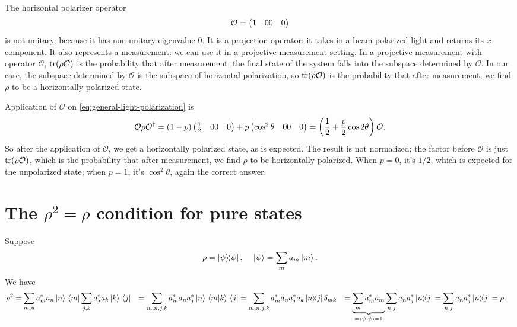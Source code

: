 \documentclass[hyperref, a4paper]{article}
\def\\{}%
\begin{document}
The horizontal polarizer operator 
\begin{equation}
    \mathcal{O} = \pmqty{
        1 & 0 \\ 0 & 0
    }
\end{equation}
is not unitary, because it has non-unitary eigenvalue $0$.
It is a projection operator: 
it takes in a beam polarized light 
and returns its $x$ component. 
It also represents a measurement:
we can use it in a projective measurement setting.
In a projective measurement with operator $\mathcal{O}$, 
$\trace (\rho \mathcal{O})$
is the probability that after measurement, 
the final state of the system falls into the subspace determined by $\mathcal{O}$.
In our case, the subspace determined by $\mathcal{O}$ 
is the subspace of horizontal polarization, 
so $\trace (\rho \mathcal{O})$ is the probability 
that after measurement, we find $\rho$ to be a horizontally polarized state.

Application of $\mathcal{O}$ on \eqref{eq:general-light-polarization} is 
\begin{equation}
    \mathcal{O} \rho \mathcal{O}^\dagger 
    = (1 - p) \pmqty{\frac{1}{2} & 0 \\ 0 & 0}
    + p \pmqty{
        \cos^2 \theta & 0 \\ 0 & 0
    }
    = \left( \frac{1}{2} + \frac{p}{2} \cos 2 \theta \right) \mathcal{O}.
\end{equation}
So after the application of $\mathcal{O}$, 
we get a horizontally polarized state, as is expected. 
The result is not normalized; 
the factor before $\mathcal{O}$ is just $\trace(\rho \mathcal{O})$,
which is the probability that 
after measurement, we find $\rho$ to be horizontally polarized.
When $p = 0$, it's $1/2$, 
which is expected for the unpolarized state; 
when $p = 1$, 
it's $\cos^2 \theta$, again the correct answer. 

\section{The $\rho^2 = \rho$ condition for pure states}

Suppose 
\begin{equation}
    \rho = \dyad{\psi}, \quad \ket*{\psi} = \sum_m a_m \ket*{m}.
\end{equation}
We have 
\begin{equation}
    \begin{aligned}
        \rho^2 & =\sum_{m, n} a_m^* a_n \ket*{n} \bra*{m} \sum_{j, k} a_j^* a_k \ket*{k} \bra*{j} \\
        & =\sum_{m, n, j, k} a_m^* a_n a_j^* \ket*{n} \braket*{m}{k} \bra*{j} \\
        & =\sum_{m, n, j, k} a_m^* a_n a_j^* a_k \dyad*{n}{j} \delta_{m k} \\
        & = \underbrace{\sum_m a_m^* a_m}_{= \braket*{\psi}{\psi} = 1} \sum_{n, j} a_n a_j^* \dyad*{n}{j} \\ 
        &= \sum_{n, j} a_n a_j^* \dyad*{n}{j} = \rho.
    \end{aligned}
\end{equation}
\end{document}
